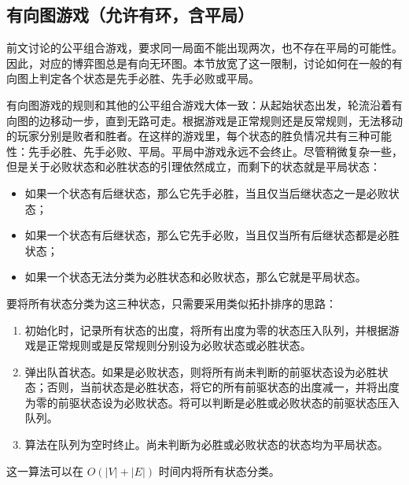 \subsection{有向图游戏（允许有环，含平局）}

前文讨论的公平组合游戏，要求同一局面不能出现两次，也不存在平局的可能性。因此，对应的博弈图总是有向无环图。本节放宽了这一限制，讨论如何在一般的有向图上判定各个状态是先手必胜、先手必败或平局。

有向图游戏的规则和其他的公平组合游戏大体一致：从起始状态出发，轮流沿着有向图的边移动一步，直到无路可走。根据游戏是正常规则还是反常规则，无法移动的玩家分别是败者和胜者。在这样的游戏里，每个状态的胜负情况共有三种可能性：先手必胜、先手必败、平局。平局中游戏永远不会终止。尽管稍微复杂一些，但是关于必败状态和必胜状态的引理依然成立，而剩下的状态就是平局状态：

\begin{itemize}
	\item 如果一个状态有后继状态，那么它先手必胜，当且仅当后继状态之一是必败状态；
	\item 如果一个状态有后继状态，那么它先手必败，当且仅当所有后继状态都是必胜状态；
	\item 如果一个状态无法分类为必胜状态和必败状态，那么它就是平局状态。
\end{itemize}

要将所有状态分类为这三种状态，只需要采用类似拓扑排序的思路：

\begin{enumerate}
	\item 初始化时，记录所有状态的出度，将所有出度为零的状态压入队列，并根据游戏是正常规则或是反常规则分别设为必败状态或必胜状态。
	\item 弹出队首状态。如果是必败状态，则将所有尚未判断的前驱状态设为必胜状态；否则，当前状态是必胜状态，将它的所有前驱状态的出度减一，并将出度为零的前驱状态设为必败状态。将可以判断是必胜或必败状态的前驱状态压入队列。
	\item 算法在队列为空时终止。尚未判断为必胜或必败状态的状态均为平局状态。
\end{enumerate}

这一算法可以在 $O(|V|+|E|)$ 时间内将所有状态分类。
